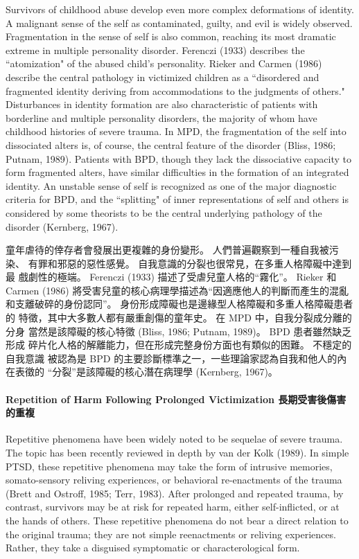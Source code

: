 \documentclass[12pt]{article}
\begin{document}
    Survivors of childhood abuse develop even more complex deformations of
    identity. A malignant sense of the self as contaminated, guilty, and evil
    is widely observed. Fragmentation in the sense of self is also common,
    reaching its most dramatic extreme in multiple personality disorder.
    Ferenczi (1933) describes the ``atomization" of the abused child's
    personality. Rieker and Carmen (1986) describe the central pathology in
    victimized children as a ``disordered and fragmented identity deriving from
    accommodations to the judgments of others." Disturbances in identity
    formation are also characteristic of patients with borderline and multiple
    personality disorders, the majority of whom have childhood histories of
    severe trauma. In MPD, the fragmentation of the self into dissociated
    alters is, of course, the central feature of the disorder (Bliss, 1986;
    Putnam, 1989). Patients with BPD, though they lack the dissociative
    capacity to form fragmented alters, have similar difficulties in the
    formation of an integrated identity. An unstable sense of self is
    recognized as one of the major diagnostic criteria for BPD, and the
    ``splitting" of inner representations of self and others is considered by
    some theorists to be the central underlying pathology of the disorder
    (Kernberg, 1967).

    童年虐待的倖存者會發展出更複雜的身份變形。 人們普遍觀察到一種自我被污染、
    有罪和邪惡的惡性感覺。 自我意識的分裂也很常見，在多重人格障礙中達到最
    戲劇性的極端。 Ferenczi (1933) 描述了受虐兒童人格的“霧化”。 Rieker 和
    Carmen (1986) 將受害兒童的核心病理學描述為“因適應他人的判斷而產生的混亂
    和支離破碎的身份認同”。 身份形成障礙也是邊緣型人格障礙和多重人格障礙患者的
    特徵，其中大多數人都有嚴重創傷的童年史。 在 MPD 中，自我分裂成分離的分身
    當然是該障礙的核心特徵 (Bliss, 1986; Putnam, 1989)。 BPD 患者雖然缺乏形成
    碎片化人格的解離能力，但在形成完整身份方面也有類似的困難。 不穩定的自我意識
    被認為是 BPD 的主要診斷標準之一，一些理論家認為自我和他人的內在表徵的
    “分裂”是該障礙的核心潛在病理學 (Kernberg, 1967)。

\paragraph{Repetition of Harm Following Prolonged Victimization
長期受害後傷害的重複}
    Repetitive phenomena have been widely noted to be sequelae of severe
    trauma. The topic has been recently reviewed in depth by van der Kolk
    (1989). In simple PTSD, these repetitive phenomena may take the form of
    intrusive memories, somato-sensory reliving experiences, or behavioral
    re-enactments of the trauma (Brett and Ostroff, 1985; Terr, 1983). After
    prolonged and repeated trauma, by contrast, survivors may be at risk for
    repeated harm, either self-inflicted, or at the hands of others. These
    repetitive phenomena do not bear a direct relation to the original trauma;
    they are not simple reenactments or reliving experiences. Rather, they take
    a disguised symptomatic or characterological form.
\end{document}
